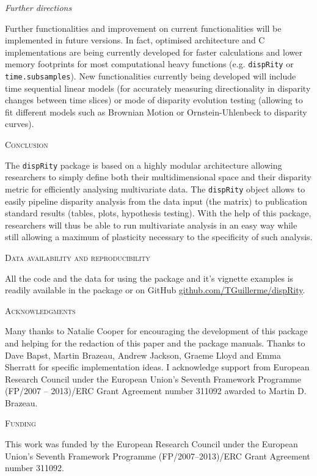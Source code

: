 \documentclass[12pt,letterpaper]{article}
\renewcommand{\section}[1]{%
\bigskip
\begin{center}
\begin{Large}
\normalfont\scshape #1
\medskip
\end{Large}
\end{center}}
\renewcommand{\subsection}[1]{%
\bigskip
\begin{center}
\begin{large}
\normalfont\itshape #1
\end{large}
\end{center}}
\newcommand{\disp}{\texttt{dispRity} }
\begin{document}
\subsection{Further directions}
Further functionalities and improvement on current functionalities will be implemented in future versions.
In fact, optimised architecture and C implementations are being currently developed for faster calculations and lower memory footprints for most computational heavy functions (e.g. \disp or \texttt{time.subsamples}).
New functionalities currently being developed will include time sequential linear models (for accurately measuring directionality in disparity changes between time slices) or mode of disparity evolution testing (allowing to fit different models such as Brownian Motion or Ornstein-Uhlenbeck to disparity curves).


\section{Conclusion}
The \disp package is based on a highly modular architecture allowing researchers to simply define both their multidimensional space and their disparity metric for efficiently analysing multivariate data.
The \disp object allows to easily pipeline disparity analysis from the data input (the matrix) to publication standard results (tables, plots, hypothesis testing).
With the help of this package, researchers will thus be able to run multivariate analysis in an easy way while still allowing a maximum of plasticity necessary to the specificity of such analysis.


\section{Data availability and reproducibility}
All the code and the data for using the package and it's vignette examples is readily available in the package or on GitHub \url{github.com/TGuillerme/dispRity}.

\section{Acknowledgments}
Many thanks to Natalie Cooper for encouraging the development of this package and helping for the redaction of this paper and the package manuals.
Thanks to Dave Bapst, Martin Brazeau, Andrew Jackson, Graeme Lloyd and Emma Sherratt for specific implementation ideas.
I acknowledge support from European Research Council under the European Union's Seventh Framework Programme (FP/2007 – 2013)/ERC Grant Agreement number 311092 awarded to Martin D. Brazeau.

\section{Funding}
This work was funded by the European Research Council under the European Union's Seventh Framework Programme (FP/2007–2013)/ERC Grant Agreement number 311092.






\end{document}
